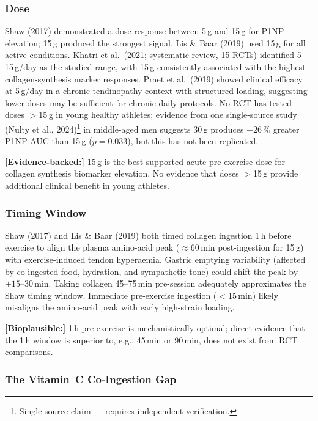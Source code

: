 \subsubsection{Dose}

Shaw (2017) demonstrated a dose-response between 5\,g and 15\,g for P1NP elevation; 15\,g produced the strongest signal. Lis \& Baar (2019) used 15\,g for all active conditions. Khatri et al.\ (2021; systematic review, 15 RCTs) identified 5--15\,g/day as the studied range, with 15\,g consistently associated with the highest collagen-synthesis marker responses. Praet et al.\ (2019) showed clinical efficacy at 5\,g/day in a chronic tendinopathy context with structured loading, suggesting lower doses may be sufficient for chronic daily protocols. No RCT has tested doses $>$15\,g in young healthy athletes; evidence from one single-source study (Nulty et al., 2024)\footnote{Single-source claim --- requires independent verification.} in middle-aged men suggests 30\,g produces $+26\,\%$ greater P1NP AUC than 15\,g ($p{=}0.033$), but this has not been replicated.

\textbf{[Evidence-backed:]} 15\,g is the best-supported acute pre-exercise dose for collagen synthesis biomarker elevation. No evidence that doses $>$15\,g provide additional clinical benefit in young athletes.

\subsubsection{Timing Window}

Shaw (2017) and Lis \& Baar (2019) both timed collagen ingestion 1\,h before exercise to align the plasma amino-acid peak (${\approx}60$\,min post-ingestion for 15\,g) with exercise-induced tendon hyperaemia. Gastric emptying variability (affected by co-ingested food, hydration, and sympathetic tone) could shift the peak by ${\pm}15$--30\,min. Taking collagen 45--75\,min pre-session adequately approximates the Shaw timing window. Immediate pre-exercise ingestion ($<$15\,min) likely misaligns the amino-acid peak with early high-strain loading.

\textbf{[Bioplausible:]} 1\,h pre-exercise is mechanistically optimal; direct evidence that the 1\,h window is superior to, e.g., 45\,min or 90\,min, does not exist from RCT comparisons.

\subsubsection{The Vitamin~C Co-Ingestion Gap}
\label{subsubsec:vitc}

